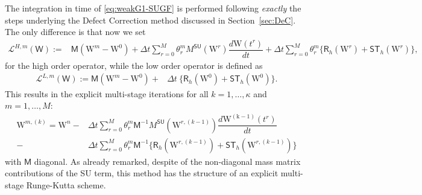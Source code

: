 \documentclass[a4paper,10pt]{article}
\begin{document}
The integration in time of \eqref{eq:weakG1-SUGF}  is performed following \emph{exactly} the steps underlying the Defect Correction method   discussed in Section~\ref{sec:DeC}. The only difference is that now
we set 
\begin{equation}
\begin{split}
	\mathcal{L}^{H,m}( \mathsf{W}  ) :=   &\mathsf{M}   (\mathrm{W}^m -  \mathrm{W}^0 )
	+ \Delta t \sum_{r=0}^M \theta_r^m M^{\textsf{SU}}(\mathrm{W}^r) \dfrac{d\mathrm{W}(t^r)}{dt} 
	+ \Delta t \sum_{r=0}^M \theta_r^m \{ \textsf{R}_h(\mathrm{W}^r)    + \mathsf{ST}_h(\mathrm{W}^r) \},
	 \end{split}
\end{equation}
for the  high order  operator, while the low order operator is defined as 
\begin{equation}
\begin{split}
	\mathcal{L}^{L,m}(\mathsf{W}  ) :=   \mathsf{M}   (\mathrm{W}^m -  \mathrm{W}^0 )
	+& \Delta t \ \{ \textsf{R}_h(\mathrm{W}^0)    + \mathsf{ST}_h(\mathrm{W}^0)\}.  
	 \end{split}
\end{equation}
This results in the   explicit multi-stage iterations for all $k=1,\dots, \kappa$ and $m=1,\dots,M$:
\begin{equation}
	\label{eq:DeC-GF}
	\begin{split}
	     \mathrm{W}^{m,(k)}  =            \mathrm{W}^n
	- &\Delta t \sum_{r=0}^M \theta_r^m \mathsf{M}^{-1}  M^{\textsf{SU}}(\mathrm{W}^{r,(k-1)}) \dfrac{d\mathrm{W^{(k-1)}}(t^r)}{dt} \\
	-& \Delta t \sum_{r=0}^M \theta_r^m \mathsf{M}^{-1}  \{ \textsf{R}_h(\mathrm{W}^{r,(k-1)})    + \mathsf{ST}_h(\mathrm{W}^{r,(k-1)}) \}
	 \end{split}
\end{equation}
 with $\mathsf{M}$ diagonal. As already remarked, despite of the non-diagonal mass matrix contributions of the SU term,
this method has the structure of an explicit multi-stage Runge-Kutta scheme. 
\end{document}
